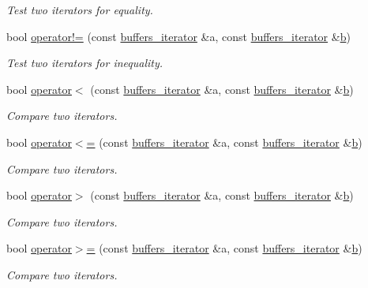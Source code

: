 \begin{DoxyCompactItemize}
\begin{DoxyCompactList}\small\item\em Test two iterators for equality. \end{DoxyCompactList}\item 
bool \hyperlink{classasio_1_1buffers__iterator_a7e494facc3c9cf73fa4db438fc6781c6}{operator!=} (const \hyperlink{classasio_1_1buffers__iterator}{buffers\+\_\+iterator} \&a, const \hyperlink{classasio_1_1buffers__iterator}{buffers\+\_\+iterator} \&\hyperlink{group__async__read_ga945a5c18fa77a9e2eba420f8f44b2a4f}{b})
\begin{DoxyCompactList}\small\item\em Test two iterators for inequality. \end{DoxyCompactList}\item 
bool \hyperlink{classasio_1_1buffers__iterator_a38d8938d217257a1610627fd1cb22aa3}{operator$<$} (const \hyperlink{classasio_1_1buffers__iterator}{buffers\+\_\+iterator} \&a, const \hyperlink{classasio_1_1buffers__iterator}{buffers\+\_\+iterator} \&\hyperlink{group__async__read_ga945a5c18fa77a9e2eba420f8f44b2a4f}{b})
\begin{DoxyCompactList}\small\item\em Compare two iterators. \end{DoxyCompactList}\item 
bool \hyperlink{classasio_1_1buffers__iterator_a3d47ec26d99d33280146bd0137cddc8f}{operator$<$=} (const \hyperlink{classasio_1_1buffers__iterator}{buffers\+\_\+iterator} \&a, const \hyperlink{classasio_1_1buffers__iterator}{buffers\+\_\+iterator} \&\hyperlink{group__async__read_ga945a5c18fa77a9e2eba420f8f44b2a4f}{b})
\begin{DoxyCompactList}\small\item\em Compare two iterators. \end{DoxyCompactList}\item 
bool \hyperlink{classasio_1_1buffers__iterator_a1113e04661a66959d1358b6d1cb9db1d}{operator$>$} (const \hyperlink{classasio_1_1buffers__iterator}{buffers\+\_\+iterator} \&a, const \hyperlink{classasio_1_1buffers__iterator}{buffers\+\_\+iterator} \&\hyperlink{group__async__read_ga945a5c18fa77a9e2eba420f8f44b2a4f}{b})
\begin{DoxyCompactList}\small\item\em Compare two iterators. \end{DoxyCompactList}\item 
bool \hyperlink{classasio_1_1buffers__iterator_ab8a2ced531e09474d4ab930225dd92ff}{operator$>$=} (const \hyperlink{classasio_1_1buffers__iterator}{buffers\+\_\+iterator} \&a, const \hyperlink{classasio_1_1buffers__iterator}{buffers\+\_\+iterator} \&\hyperlink{group__async__read_ga945a5c18fa77a9e2eba420f8f44b2a4f}{b})
\begin{DoxyCompactList}\small\item\em Compare two iterators. \end{DoxyCompactList}\end{DoxyCompactItemize}


